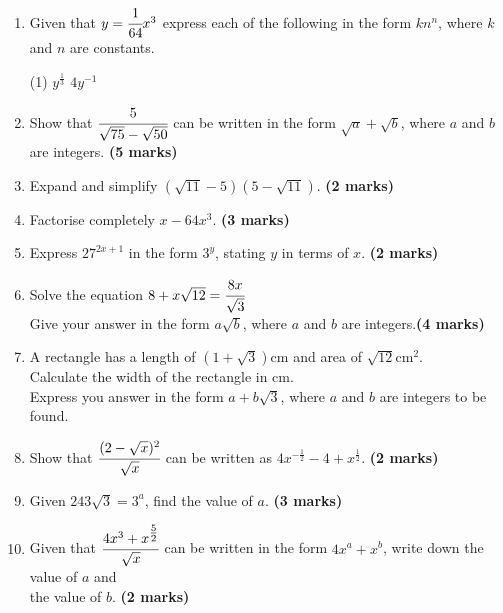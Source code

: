 \documentclass[fleqn]{article}
\begin{document}
\begin{enumerate}
	\item Given that $y=\cfrac{1}{64}x^3$ express each of the following in the form $kn^n$, where $k$ and $n$ are constants. \vspace{-2mm}
		\begin{tasks}(1)
			\task $y^{\textstyle\frac{1}{3}}$
			\task $4y^{-1}$
		\end{tasks}
		\vspace{-4mm}
	\item Show that $\cfrac{5}{\sqrt{75}-\sqrt{50}}$ can be written in the form $\sqrt{a}+\sqrt{b}$, where $a$ and $b$ are integers. \hfill\textbf{(5 marks)}
	\item Expand and simplify $(\sqrt{11}-5)(5-\sqrt{11})$. \hfill\textbf{(2 marks)}
	\item Factorise completely $x-64x^3$. \hfill\textbf{(3 marks)}
	\item Express $27^{2x+1}$ in the form $3^y$, stating $y$ in terms of $x$. \hfill\textbf{(2 marks)}
	\item \vspace{-2mm}Solve the equation $8+x\sqrt{12}=\cfrac{8x}{\sqrt{3}}$\\
		Give your answer in the form $a\sqrt{b}$, where $a$ and $b$ are integers.\hfill\textbf{(4 marks)}
	\item A rectangle has a length of $(1+\sqrt{3})$cm and area of $\sqrt{12}$cm$^2$.\\
		  Calculate the width of the rectangle in cm.\\
		  Express you answer in the form $a+b\sqrt{3}$, where $a$ and $b$ are integers to be found.
	\item Show that $\cfrac{(2-\sqrt{x})^2}{\sqrt{x}}$ can be written as $4x^{-\textstyle\frac{1}{2}}-4+x^{\textstyle\frac{1}{2}}$. \hfill\textbf{(2 marks)}
	\item Given $243\sqrt{3}=3^a$, find the value of $a$. \hfill\textbf{(3 marks)}
	\item \vspace{-1.5mm}Given that $\cfrac{4x^3+x^{\textstyle\frac{5}{2}}}{\sqrt{x}}$ can be written in the form $4x^a+x^b$, write down the value of $a$ and\\ the value of $b$. \hfill\textbf{(2 marks)}
\end{enumerate}
\end{document}

